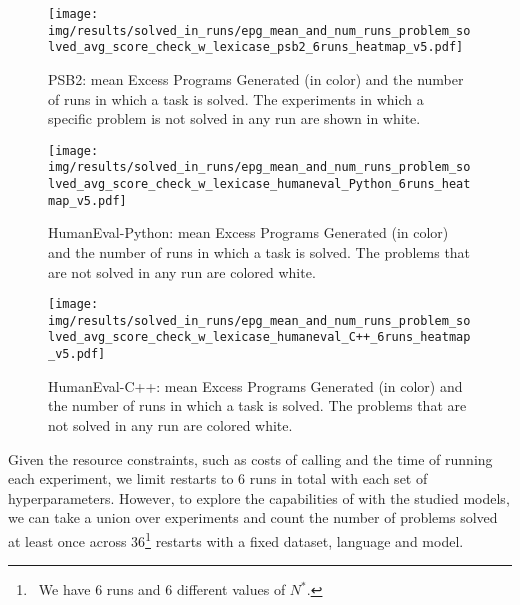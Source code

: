 \begin{figure}[tb]
  \centering
  \texttt{[image: img/results/solved\_in\_runs/epg\_mean\_and\_num\_runs\_problem\_solved\_avg\_score\_check\_w\_lexicase\_psb2\_6runs\_heatmap\_v5.pdf]}
  \caption{PSB2: mean Excess Programs Generated (in color) and the number of runs in which a task is solved. The experiments in which a specific problem is not solved in any run are shown in white.
  }
  \label{fig:epg-num-solved-psb2}
  \vspace{-3ex}
\end{figure}

\begin{figure}[hbt!]
  \centering
  \texttt{[image: img/results/solved\_in\_runs/epg\_mean\_and\_num\_runs\_problem\_solved\_avg\_score\_check\_w\_lexicase\_humaneval\_Python\_6runs\_heatmap\_v5.pdf]}
  \vspace{-6pt}
  \caption{HumanEval-Python: mean Excess Programs Generated (in color) and the number of runs in which a task is solved. The problems that are not solved in any run are colored white.}
  \label{fig:epg-num-solved-he-python}
  \vspace{-10pt}
\end{figure}

\begin{figure}[hbt!]
  \centering
  \texttt{[image: img/results/solved\_in\_runs/epg\_mean\_and\_num\_runs\_problem\_solved\_avg\_score\_check\_w\_lexicase\_humaneval\_C++\_6runs\_heatmap\_v5.pdf]}  %
  \vspace{-6pt}
  \caption{HumanEval-C++: mean Excess Programs Generated (in color) and the number of runs in which a task is solved. The problems that are not solved in any run are colored white.}
  \label{fig:epg-num-solved-he-c++}
  \vspace{-10pt}
\end{figure}


Given the resource constraints, such as costs of calling \gpt{} and the time of running each experiment, we limit restarts to 6 runs in total with each set of hyperparameters.
However, to explore the capabilities of \method{} with the studied models, we can take a union over experiments and count the number of problems solved at least once across 36\footnote{~We have 6 runs and 6 different values of $N^*.$} restarts with a fixed dataset, language and model.

